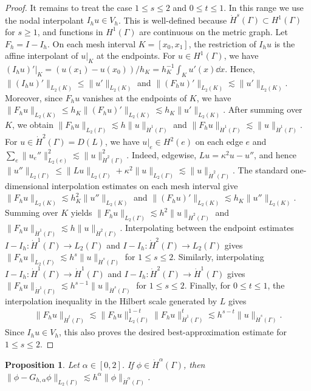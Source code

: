 \documentclass[numbers,webpdf]{ima-authoring-template}%
\theoremstyle{thmstyletwo}%
\newtheorem{proposition}[theorem]{Proposition}%
\numberwithin{equation}{section}
\begin{document}
\begin{proof}
    It remains to treat the case $1\leq s\leq2$ and $0\leq t\leq1$. In this range we use the nodal interpolant $I_hu\in V_h$. This is well-defined because $\dot H^s(\Gamma)\subset H^1(\Gamma)$ for $s\geq1$, and functions in $H^1(\Gamma)$ are continuous on the metric graph. Let $F_h = I-I_h$. On each mesh interval $K=[x_0,x_1]$, the restriction of $I_hu$ is the affine interpolant of $u|_K$ at the endpoints. For $u\in H^1(\Gamma)$, we have $(I_hu)'|_K = (u(x_1)-u(x_0))/h_K= h_K^{-1}\int_K u'(x)\dd x$. Hence, $\|(I_hu)'\|_{L_2(K)}\leq\|u'\|_{L_2(K)}$ and $ \|(F_hu)'\|_{L_2(K)}\lesssim\|u'\|_{L_2(K)}$. Moreover, since $F_hu$ vanishes at the endpoints of $K$, we have $\|F_hu\|_{L_2(K)}\leq h_K\|(F_hu)'\|_{L_2(K)}\lesssim h_K\|u'\|_{L_2(K)}$. After summing over $K$, we obtain $\|F_hu\|_{L_2(\Gamma)}\lesssim h\|u\|_{\dot H^1(\Gamma)}$ and  $\|F_hu\|_{\dot H^1(\Gamma)}\lesssim\|u\|_{\dot H^1(\Gamma)}$. For $u\in\dot H^2(\Gamma)=D(L)$, we have $u|_e\in H^2(e)$ on each edge $e$ and $        \sum_{e}\|u_e''\|_{L_2(e)}^2\lesssim\|u\|_{\dot H^2(\Gamma)}^2$. Indeed, edgewise, $Lu=\kappa^2u-u''$, and hence $\|u''\|_{L_2(\Gamma)}\leq\|Lu\|_{L_2(\Gamma)}+\kappa^2\|u\|_{L_2(\Gamma)}\lesssim\|u\|_{\dot H^2(\Gamma)}$. The standard one-dimensional interpolation estimates on each mesh interval give $\|F_hu\|_{L_2(K)}\lesssim h_K^2\|u''\|_{L_2(K)}$ and $\|(F_hu)'\|_{L_2(K)}\lesssim h_K\|u''\|_{L_2(K)}$. Summing over $K$ yields $\|F_hu\|_{L_2(\Gamma)}\lesssim h^2\|u\|_{\dot H^2(\Gamma)}$ and $\|F_hu\|_{\dot H^1(\Gamma)}\lesssim h\|u\|_{\dot H^2(\Gamma)}$. Interpolating between the endpoint estimates $I-I_h:\dot H^1(\Gamma)\to L_2(\Gamma)$ and $I-I_h:\dot H^2(\Gamma)\to L_2(\Gamma)$ gives $\|F_hu\|_{L_2(\Gamma)}\lesssim h^s\|u\|_{\dot H^s(\Gamma)} $ for $1\leq s\leq2$. Similarly, interpolating $I-I_h:\dot H^1(\Gamma)\to \dot H^1(\Gamma)$ and $I-I_h:\dot H^2(\Gamma)\to \dot H^1(\Gamma)$ gives $\|F_hu\|_{\dot H^1(\Gamma)}\lesssim h^{s-1}\|u\|_{\dot H^s(\Gamma)}$ for $1\leq s\leq2$. Finally, for $0\leq t\leq1$, the interpolation inequality in the Hilbert scale generated by $L$ gives 
    \begin{align*}
        \|F_hu\|_{\dot H^t(\Gamma)}
        \lesssim
        \|F_hu\|_{L_2(\Gamma)}^{1-t}
        \|F_hu\|_{\dot H^1(\Gamma)}^t  \lesssim h^{s-t}\|u\|_{\dot H^s(\Gamma)} .
    \end{align*}
    Since $I_hu\in V_h$, this also proves the desired best-approximation estimate for $1\leq s\leq2$.
    \hfill
\end{proof}
\begin{proposition}
\label{proposition:with_elliptic_projection}
Let $\alpha\in[0,2]$. If $\phi\in\dot{H}^{\alpha}(\Gamma)$, then $\|\phi - G_{h,\alpha}\phi\|_{L_2(\Gamma)} \lesssim h^\alpha\|\phi\|_{\dot{H}^{\alpha}(\Gamma)}$.
\end{proposition}
\end{document}
